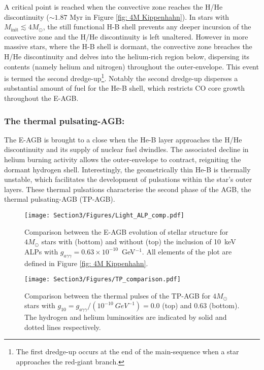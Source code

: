 A critical point is reached when the convective zone reaches the H/He discontinuity ($\sim1.87$ Myr in Figure \ref{fig: 4M Kippenhahn}). In stars with $M_{\mathrm{init}}\lesssim4M_{\odot}$, the still functional H-B shell prevents any deeper incursion of the convective zone and the H/He discontinuity is left unaltered. However in more massive stars, where the H-B shell is dormant, the convective zone breaches the H/He discontinuity and delves into the helium-rich region below, dispersing its contents (namely helium and nitrogen) throughout the outer-envelope. This event is termed the second dredge-up\footnote{The first dredge-up occurs at the end of the main-sequence when a star approaches the red-giant branch.}. Notably the second dredge-up disperses a substantial amount of fuel for the He-B shell, which restricts CO core growth throughout the E-AGB.



\subsubsection*{The thermal pulsating-AGB:}
The E-AGB is brought to a close when the He-B layer approaches the H/He discontinuity and its supply of nuclear fuel dwindles. The associated decline in helium burning activity allows the outer-envelope to contract, reigniting the dormant hydrogen shell. Interestingly, the geometrically thin He-B is thermally unstable, which facilitates the development of pulsations within the star's outer layers. These thermal pulsations characterise the second phase of the AGB, the thermal pulsating-AGB (TP-AGB).


\begin{figure}[t]
\centering
\texttt{[image: Section3/Figures/Light\_ALP\_comp.pdf]}
\caption{Comparison between the E-AGB evolution of stellar structure for $4M_{\odot}$ stars with (bottom) and without (top) the inclusion of 10~keV ALPs with $g_{a\gamma\gamma}=0.63\times10^{-10}$~GeV$^{-1}$. All elements of the plot are defined in Figure \ref{fig: 4M Kippenhahn}.}
\label{fig: Low Mass AGB Comp}
\end{figure}
\begin{figure}[t]
    \centering
    \texttt{[image: Section3/Figures/TP\_comparison.pdf]}
    \caption{Comparison between the thermal pulses of the TP-AGB for $4M_{\odot}$ stars with $g_{10}=g_{a\gamma\gamma}/(10^{-10}\ GeV^{-1})=0.0$ (top) and 0.63 (bottom). The hydrogen and helium luminosities are indicated by solid and dotted lines respectively.}
    \label{fig: TP Comparison}
\end{figure}

